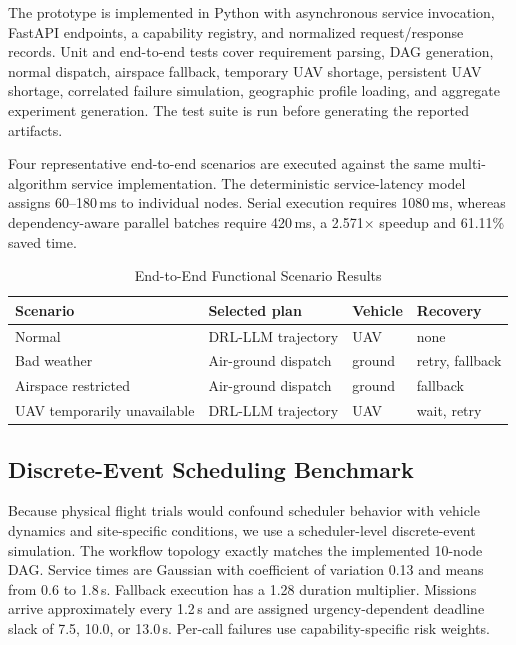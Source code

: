 \documentclass[conference]{IEEEtran}
\begin{document}
The prototype is implemented in Python with asynchronous service invocation,
FastAPI endpoints, a capability registry, and normalized request/response
records. Unit and end-to-end tests cover requirement parsing, DAG generation,
normal dispatch, airspace fallback, temporary UAV shortage, persistent UAV
shortage, correlated failure simulation, geographic profile loading, and
aggregate experiment generation. The test suite is run before generating the
reported artifacts.

Four representative end-to-end scenarios are executed against the same
multi-algorithm service implementation. The deterministic service-latency
model assigns 60--180\,ms to individual nodes. Serial execution requires
1080\,ms, whereas dependency-aware parallel batches require 420\,ms, a
2.571$\times$ speedup and 61.11\% saved time.

\begin{table}[t]
\caption{End-to-End Functional Scenario Results}
\label{tab:functional}
\centering
\footnotesize
\begin{tabular}{p{1.55cm}p{1.55cm}p{1.25cm}p{1.35cm}}
\toprule
\textbf{Scenario} & \textbf{Selected plan} & \textbf{Vehicle} &
\textbf{Recovery}\\
\midrule
Normal & DRL-LLM trajectory & UAV & none\\
Bad weather & Air-ground dispatch & ground & retry, fallback\\
Airspace restricted & Air-ground dispatch & ground & fallback\\
UAV temporarily unavailable & DRL-LLM trajectory & UAV & wait, retry\\
\bottomrule
\end{tabular}
\end{table}

\subsection{Discrete-Event Scheduling Benchmark}

Because physical flight trials would confound scheduler behavior with vehicle
dynamics and site-specific conditions, we use a scheduler-level
discrete-event simulation. The workflow topology exactly matches the
implemented 10-node DAG. Service times are Gaussian with coefficient of
variation 0.13 and means from 0.6 to 1.8\,s. Fallback execution has a 1.28
duration multiplier. Missions arrive approximately every 1.2\,s and are
assigned urgency-dependent deadline slack of 7.5, 10.0, or 13.0\,s. Per-call
failures use capability-specific risk weights.
\end{document}
